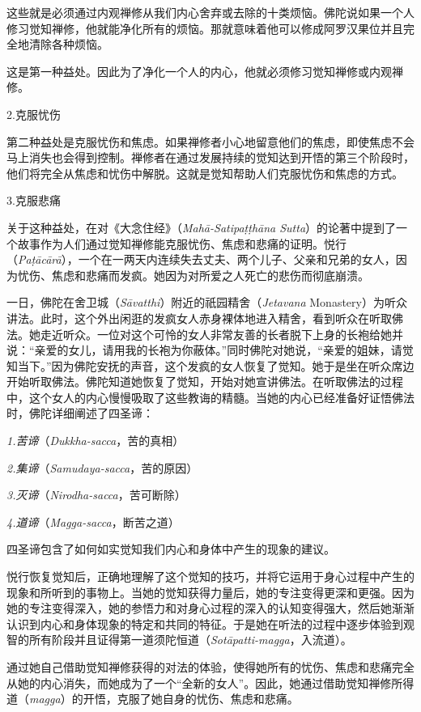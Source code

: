 这些就是必须通过内观禅修从我们内心舍弃或去除的十类烦恼。佛陀说如果一个人修习觉知禅修，他就能净化所有的烦恼。那就意味着他可以修成阿罗汉果位并且完全地清除各种烦恼。

这是第一种益处。因此为了净化一个人的内心，他就必须修习觉知禅修或内观禅修。

\sssubsectnon 2.克服忧伤

第二种益处是克服忧伤和焦虑。如果禅修者小心地留意他们的焦虑，即使焦虑不会马上消失也会得到控制。禅修者在通过发展持续的觉知达到开悟的第三个阶段时，他们将完全从焦虑和忧伤中解脱。这就是觉知帮助人们克服忧伤和焦虑的方式。

\sssubsectnon 3.克服悲痛

关于这种益处，在对《大念住经》（{\it Mah\=a-Satipa\d t\d th\=ana Sutta}）的论著中提到了一个故事作为人们通过觉知禅修能克服忧伤、焦虑和悲痛的证明。悦行（{\it Pa\d t\=ac\=ar\=a}），一个在一两天内连续失去丈夫、两个儿子、父亲和兄弟的女人，因为忧伤、焦虑和悲痛而发疯。她因为对所爱之人死亡的悲伤而彻底崩溃。

\1一日，佛陀在舍卫城（{\it S\=avatthi}）附近的祇园精舍（{\it Jetavana} Monastery）为听众讲法。此时，这个外出闲逛的发疯女人赤身裸体地进入精舍，看到听众在听取佛法。她走近听众。一位对这个可怜的女人非常友善的长者脱下上身的长袍给她并说：“亲爱的女儿，请用我的长袍为你蔽体。”同时佛陀对她说，“亲爱的姐妹，请觉知当下。”因为佛陀安抚的声音，这个发疯的女人恢复了觉知。她于是坐在听众席边开始听取佛法。佛陀知道她恢复了觉知，开始对她宣讲佛法。在听取佛法的过程中，这个女人的内心慢慢吸取了这些教诲的精髓。当她的内心已经准备好证悟佛法时，佛陀详细阐述了四圣谛：

\item{}{\it 1.苦谛}（{\it Dukkha-sacca}，苦的真相）
\item{}{\it 2.集谛}（{\it Samudaya-sacca}，苦的原因）
\item{}{\it 3.灭谛}（{\it Nirodha-sacca}，苦可断除）
\item{}{\it 4.道谛}（{\it Magga-sacca}，断苦之道）

四圣谛包含了如何如实觉知我们内心和身体中产生的现象的建议。

悦行恢复觉知后，正确地理解了这个觉知的技巧，并将它运用于身心过程中产生的现象和所听到的事物上。当她的觉知获得\1力量后，她的专注变得更深和更强。因为她的专注变得深入，她的参悟力和对身心过程的深入的认知变得强大，然后她渐渐认识到内心和身体现象的特定和共同的特征。于是她在听法的过程中逐步体验到观智的所有阶段并且证得第一道须陀恒道（{\it Sot\=apatti-magga}，入流道）。

通过她自己借助觉知禅修获得的对法的体验，使得她所有的忧伤、焦虑和悲痛完全从她的内心消失，而她成为了一个“全新的女人”。因此，她通过借助觉知禅修所得道（{\it magga}）的开悟，克服了她自身的忧伤、焦虑和悲痛。


